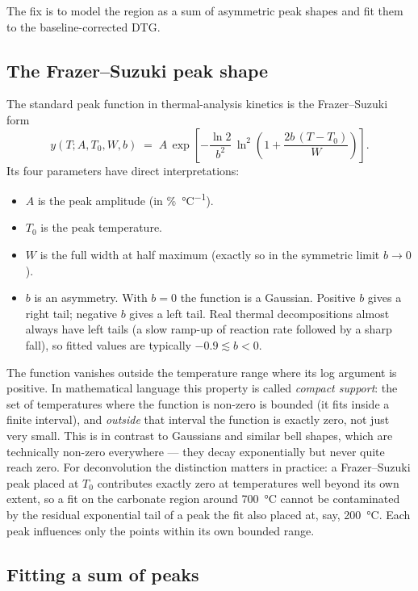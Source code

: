\documentclass[11pt]{article}
\begin{document}
The fix is to model the region as a sum of asymmetric peak shapes and
fit them to the baseline-corrected DTG.

\subsection{The Frazer--Suzuki peak shape}

The standard peak function in thermal-analysis kinetics is the
Frazer--Suzuki form
\[
  y(T; A, T_0, W, b) \;=\;
  A\,\exp\!\left[
    -\frac{\ln 2}{b^{2}}\,
    \ln^{2}\!\left(1 + \frac{2b\,(T - T_0)}{W}\right)
  \right].
\]
Its four parameters have direct interpretations:
\begin{itemize}
  \item $A$ is the peak amplitude (in \unit{\percent\per\celsius}).
  \item $T_0$ is the peak temperature.
  \item $W$ is the full width at half maximum (exactly so in the
        symmetric limit $b \to 0$).
  \item $b$ is an asymmetry. With $b = 0$ the function is a Gaussian.
        Positive $b$ gives a right tail; negative $b$ gives a left
        tail. Real thermal decompositions almost always have left
        tails (a slow ramp-up of reaction rate followed by a sharp
        fall), so fitted values are typically $-0.9 \lesssim b < 0$.
\end{itemize}
The function vanishes outside the temperature range where its log
argument is positive. In mathematical language this property is
called \emph{compact support}: the set of temperatures where the
function is non-zero is bounded (it fits inside a finite interval),
and \emph{outside} that interval the function is exactly zero, not
just very small. This is in contrast to Gaussians and similar bell
shapes, which are technically non-zero everywhere --- they decay
exponentially but never quite reach zero. For deconvolution the
distinction matters in practice: a Frazer--Suzuki peak placed at
$T_0$ contributes exactly zero at temperatures well beyond its own
extent, so a fit on the carbonate region around \qty{700}{\celsius}
cannot be contaminated by the residual exponential tail of a peak the
fit also placed at, say, \qty{200}{\celsius}.  Each peak influences
only the
points within its own bounded range.

\subsection{Fitting a sum of peaks}
\end{document}
